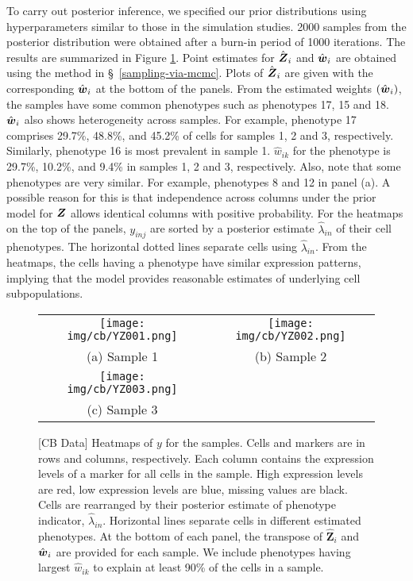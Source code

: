 \documentclass[12pt,]{article}
\def\Z{\bm{Z}}
\newcommand{\bZ}{\mbox{\boldmath $Z$}}
\newcommand{\bw}{\mbox{\boldmath $w$}}
\begin{document}
To carry out posterior inference, we specified our prior distributions using
hyperparameters similar to those in the simulation studies. 2000 samples from
the posterior distribution were obtained after a burn-in period of 1000
iterations. The results are summarized in Figure \ref{fig:cb-post-Z}.  Point
estimates for $\hat{\bZ}_i$ and $\hat{\bw}_i$ are obtained using the method in
\S~\ref{sampling-via-mcmc}.
Plots of $\hat{\bZ}_i$ are given with the corresponding $\hat{\bw}_i$ at the
bottom of the panels.  From the estimated weights $(\hat{\bw}_i)$, the samples
have some common phenotypes such as phenotypes 17, 15 and 18.
$\hat{\bw}_i$ also shows heterogeneity across samples.  For example, phenotype
17 comprises 29.7\%, 48.8\%, and 45.2\% of cells for samples 1, 2 and 3,
respectively.
%
Similarly, phenotype 16 is most prevalent in sample 1.  $\hat{w}_{ik}$ for the
phenotype is 29.7\%, 10.2\%, and 9.4\% in samples 1, 2 and 3, respectively.
%
Also, note that some phenotypes are very similar. For example, phenotypes 8 and
12 in panel (a).  A possible reason for this is that independence across
columns under the prior model for $\bZ$ allows identical columns with positive
probability.  For the heatmaps on the top of the panels, $y_{inj}$ are sorted
by a posterior estimate $\hat{\lambda}_{in}$ of their cell phenotypes. The
horizontal dotted lines separate cells using $\hat{\lambda}_{in}$.  From the
heatmaps, the cells having a phenotype have similar expression patterns,
implying that the model provides reasonable estimates of underlying cell
subpopulations.
\begin{figure}[th!]
\begin{center}
  \begin{tabular}{cc}
  \texttt{[image: img/cb/YZ001.png]}&
  \texttt{[image: img/cb/YZ002.png]}\\
  (a) Sample 1 & (b) Sample 2 \\
  \texttt{[image: img/cb/YZ003.png]} &\\
  (c) Sample 3 & \\
  \end{tabular}
\end{center}
\vspace{-0.05in}
\caption{[CB Data]  Heatmaps of $y$ for the samples. Cells and markers are in
rows and columns, respectively. Each column contains the expression levels of
a marker for all cells in the sample. High expression levels are red, low
expression levels are blue, missing values are black.   Cells are rearranged
by their posterior estimate of phenotype indicator, $\hat{\lambda}_{in}$.
Horizontal lines separate cells in different estimated phenotypes.
At the bottom of each panel, the transpose of $\hat{\Z}_i$
and $\hat{\bw}_i$ are provided for each sample. We include phenotypes having
largest $\hat{w}_{ik}$ to explain at least 90\% of the cells in a sample.}
\label{fig:cb-post-Z}
\end{figure}
\end{document}
